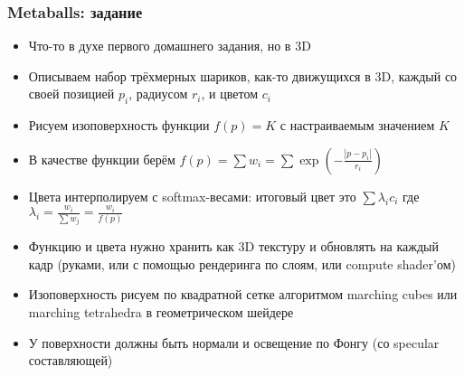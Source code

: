 \documentclass{beamer}
\begin{document}
\begin{frame}[fragile]
\frametitle{Metaballs: задание}
\fontsize{8pt}{8pt}
\selectfont
\begin{itemize}
\item Что-то в духе первого домашнего задания, но в 3D
\item Описываем набор трёхмерных шариков, как-то движущихся в 3D, каждый со своей позицией \begin{math}p_i\end{math}, радиусом \begin{math}r_i\end{math}, и цветом \begin{math}c_i\end{math}
\item Рисуем изоповерхность функции \begin{math}f(p) = K\end{math} с настраиваемым значением \begin{math}K\end{math}
\item В качестве функции берём \begin{math}f(p) = \sum w_i = \sum \exp\left(-\frac{|p-p_i|}{r_i}\right)\end{math}
\item Цвета интерполируем с softmax-весами: итоговый цвет это \begin{math}\sum \lambda_i c_i\end{math} где \begin{math}\lambda_i = \frac{w_i}{\sum w_j} = \frac{w_i}{f(p)}\end{math}
\item Функцию и цвета нужно хранить как 3D текстуру и обновлять на каждый кадр (руками, или с помощью рендеринга по слоям, или compute shader'ом)
\item Изоповерхность рисуем по квадратной сетке алгоритмом marching cubes или marching tetrahedra в геометрическом шейдере
\item У поверхности должны быть нормали и освещение по Фонгу (со specular составляющей)
\end{itemize}
\end{frame}
\end{document}

